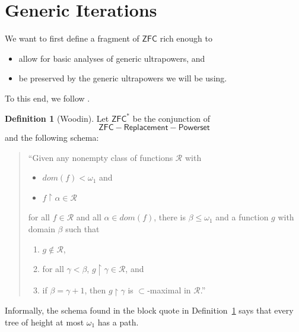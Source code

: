 \documentclass[12pt, twoside]{memoir}
\numberwithin{equation}{section}
\theoremstyle{definition}
\newtheorem{defi}[thm]{Definition}
\theoremstyle{remark}
\theoremstyle{definition}
\theoremstyle{definition}
\theoremstyle{definition}
\theoremstyle{remark}
\begin{document}
\section{Generic Iterations}

We want to first define a fragment of $\mathsf{ZFC}$ rich enough to 
\begin{itemize}
    \item allow for basic analyses of generic ultrapowers, and
    \item be preserved by the generic ultrapowers we will be using.
\end{itemize}
To this end, we follow \cite[Section 3.1]{woodin}.

\begin{defi}[Woodin]\label{nota1}
Let $\mathsf{ZFC}^*$ be the conjunction of $$\mathsf{ZFC} - \mathsf{Replacement} - \mathsf{Powerset}$$ and the following schema:
\begin{quote}
    ``Given any nonempty class of functions $\mathcal{R}$ with
    \begin{itemize}
        \item $dom(f) < \omega_1$ and
        \item $f \restriction \alpha \in \mathcal{R}$
    \end{itemize}
    for all $f \in \mathcal{R}$ and all $\alpha \in dom(f)$, there is $\beta \leq \omega_1$ and a function $g$ with domain $\beta$ such that
    \begin{enumerate}[label=(\alph*)]
        \item $g \not \in \mathcal{R}$,
        \item for all $\gamma < \beta$, $g \restriction \gamma \in \mathcal{R}$, and
        \item if $\beta = \gamma + 1$, then $g \restriction \gamma$ is $\subset$-maximal in $\mathcal{R}$.''
    \end{enumerate}
\end{quote}
\end{defi}

Informally, the schema found in the block quote in Definition~\ref{nota1} says that every tree of height at most $\omega_1$ has a path.
\end{document}
